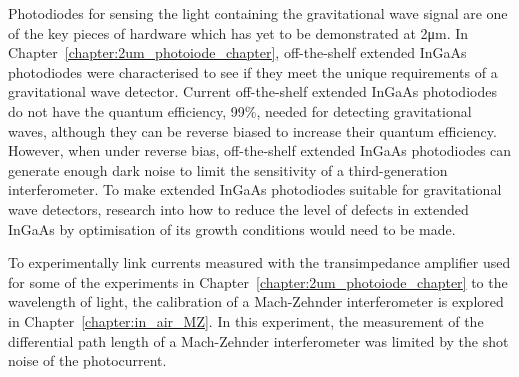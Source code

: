 Photodiodes for sensing the light containing the gravitational wave signal are one of the key pieces of hardware which has yet to be demonstrated at 2\si{\micro\metre}. In Chapter~\ref{chapter:2um_photoiode_chapter}, off-the-shelf extended InGaAs photodiodes were characterised to see if they meet the unique requirements of a gravitational wave detector. Current off-the-shelf extended InGaAs photodiodes do not have the quantum efficiency, 99\%, needed for detecting gravitational waves, although they can be reverse biased to increase their quantum efficiency. However, when under reverse bias, off-the-shelf extended InGaAs photodiodes can generate enough dark noise to limit the sensitivity of a third-generation interferometer. To make extended InGaAs photodiodes suitable for gravitational wave detectors, research into how to reduce the level of defects in extended InGaAs by optimisation of its growth conditions would need to be made.
\par
To experimentally link currents measured with the transimpedance amplifier used for some of the experiments in Chapter~\ref{chapter:2um_photoiode_chapter} to the wavelength of light, the calibration of a Mach-Zehnder interferometer is explored in Chapter~\ref{chapter:in_air_MZ}. In this experiment, the measurement of the differential path length of a Mach-Zehnder interferometer was limited by the shot noise of the photocurrent.